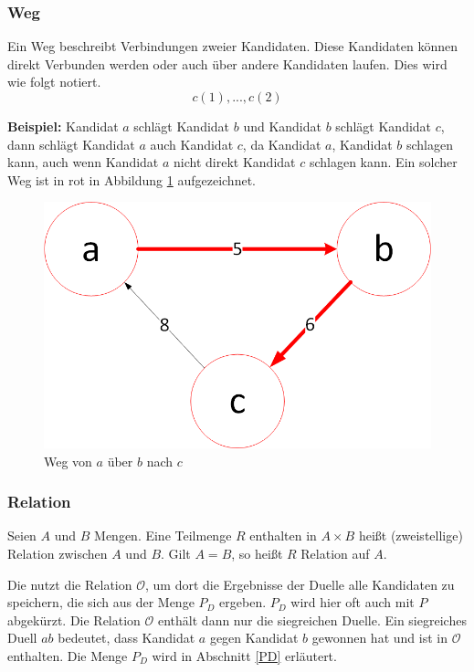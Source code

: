 \newpage
\subsubsection{Weg}
\label{weg}
Ein Weg beschreibt Verbindungen zweier Kandidaten. Diese Kandidaten können direkt Verbunden werden oder auch über andere Kandidaten laufen. Dies wird wie folgt notiert.
\[
c(1),...,c(2)
\]

\textbf{Beispiel:} Kandidat $a$ schlägt Kandidat $b$ und Kandidat $b$ schlägt Kandidat $c$, dann schlägt Kandidat $a$ auch Kandidat $c$, da Kandidat $a$, Kandidat $b$ schlagen kann, auch wenn Kandidat $a$ nicht direkt Kandidat $c$ schlagen kann. Ein solcher Weg ist in rot in Abbildung \ref{fig:weg} aufgezeichnet. 

\begin{figure}[!h]
\centering
\includegraphics[scale=0.5]{Bilder/Weg.png}
\caption{Weg von $a$ über $b$ nach $c$}
\label{fig:weg}
\end{figure}

\subsubsection{Relation}
\label{relation}
\glqq Seien $A$ und $B$ Mengen. Eine Teilmenge $R$ enthalten in $A \times B$ heißt (zweistellige) Relation zwischen $A$ und $B$. Gilt $A = B$, so heißt $R$ Relation auf $A$.\grqq{} \citet{Lang2018}

Die \schulze nutzt die Relation $\mathcal{O}$, um dort die Ergebnisse der Duelle alle Kandidaten zu speichern, die sich aus der Menge $P_{D}$ ergeben. $P_{D}$ wird hier oft auch mit $P$ abgekürzt. Die  Relation $\mathcal{O}$ enthält dann nur die siegreichen Duelle. Ein siegreiches Duell $ab$ bedeutet, dass Kandidat $a$ gegen Kandidat $b$ gewonnen hat und ist in $\mathcal{O}$ enthalten. Die Menge $P_{D}$ wird in Abschnitt \ref{PD} erläutert.


